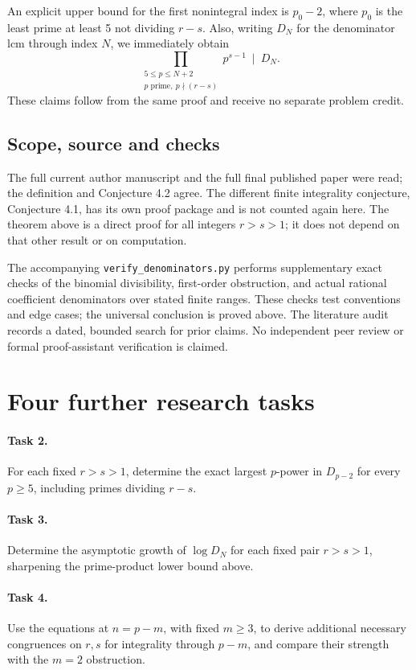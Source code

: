\documentclass[11pt]{article}
\begin{document}
An explicit upper bound for the first nonintegral index is $p_0-2$, where
$p_0$ is the least prime at least 5 not dividing $r-s$. Also, writing $D_N$
for the denominator lcm through index $N$, we immediately obtain
\[
 \prod_{\substack{5\le p\le N+2\\p\text{ prime},\ p\nmid(r-s)}}p^{s-1}
 \ \mid\ D_N.
\]
These claims follow from the same proof and receive no separate problem credit.

\subsection*{Scope, source and checks}
The full current author manuscript and the full final published paper
were read; the definition and Conjecture 4.2 agree. The different finite
integrality conjecture, Conjecture 4.1, has its own proof package and is
not counted again here. The theorem above is a direct proof for all
integers $r>s>1$; it does not depend on that other result or on computation.

The accompanying \texttt{verify\_denominators.py} performs supplementary
exact checks of the binomial divisibility, first-order obstruction, and
actual rational coefficient denominators over stated finite ranges.
These checks test conventions and edge cases; the universal conclusion
is proved above. The literature audit records a dated, bounded search
for prior claims. No independent peer review or formal proof-assistant
verification is claimed.

\section*{Four further research tasks}
\paragraph{Task 2.} For each fixed $r>s>1$, determine the exact largest
$p$-power in $D_{p-2}$ for every $p\ge5$, including primes dividing $r-s$.
\paragraph{Task 3.} Determine the asymptotic growth of $\log D_N$ for each
fixed pair $r>s>1$, sharpening the prime-product lower bound above.
\paragraph{Task 4.} Use the equations at $n=p-m$, with fixed $m\ge3$, to
derive additional necessary congruences on $r,s$ for integrality through
$p-m$, and compare their strength with the $m=2$ obstruction.
\end{document}
